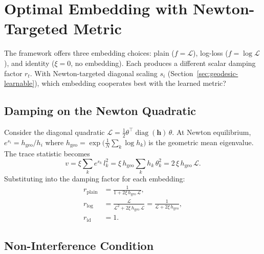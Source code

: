 \documentclass{article}
\newcommand{\loss}{\mathcal{L}}
\newcommand{\vecb}[1]{\boldsymbol{#1}}
\begin{document}
\section{Optimal Embedding with Newton-Targeted Metric}\label{sec:embedding-choice}

The framework offers three embedding choices:
plain ($f=\loss$), log-loss ($f=\log\loss$), and identity ($\xi=0$, no embedding).
Each produces a different scalar damping factor $r_t$.
With Newton-targeted diagonal scaling $s_i$
(Section~\ref{sec:geodesic-learnable}),
which embedding cooperates best with the learned metric?

\subsection{Damping on the Newton Quadratic}

Consider the diagonal quadratic $\loss = \tfrac{1}{2}\theta^\top\!\operatorname{diag}(\vecb{h})\,\theta$.
At Newton equilibrium, $e^{s_i} = h_\mathrm{geo}/h_i$
where $h_\mathrm{geo} = \exp\!\bigl(\tfrac{1}{N}\sum_k \log h_k\bigr)$
is the geometric mean eigenvalue.
The trace statistic becomes
\begin{equation}\label{eq:embed-v}
    v = \xi\sum_k e^{s_k}\,l_k^2
      = \xi\,h_\mathrm{geo}\sum_k h_k\,\theta_k^2
      = 2\,\xi\,h_\mathrm{geo}\,\loss.
\end{equation}
Substituting into the damping factor for each embedding:
\begin{align}
    r_{\text{plain}} &= \frac{1}{1 + 2\xi\,h_\mathrm{geo}\,\loss},
    \label{eq:r-plain}\\[4pt]
    r_{\text{log}} &= \frac{\loss}{\loss^2 + 2\xi\,h_\mathrm{geo}\,\loss}
                    = \frac{1}{\loss + 2\xi\,h_\mathrm{geo}},
    \label{eq:r-log}\\[4pt]
    r_{\text{id}} &= 1.
    \label{eq:r-id}
\end{align}

\subsection{Non-Interference Condition}
\end{document}
